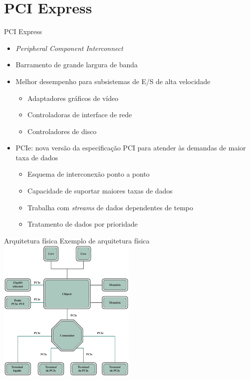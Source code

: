\section[slide=true]{PCI Express}
\begin{slide}{PCI Express}
	\begin{itemize}
		\item \textit{Peripheral Component Interconnect}
		\item Barramento de grande largura de banda
		\item Melhor desempenho para subsistemas de E/S de alta velocidade
			\begin{itemize}
				\item Adaptadores gráficos de vídeo
				\item Controladoras de interface de rede
				\item Controladores de disco
			\end{itemize}
		\item PCIe: nova versão da especificação PCI para atender às demandas de maior taxa de dados
			\begin{itemize}
				\item Esquema de interconexão ponto a ponto
				\item Capacidade de suportar maiores taxas de dados
				\item Trabalha com \textit{streams} de dados dependentes de tempo
				\item Tratamento de dados por prioridade
			\end{itemize}
	\end{itemize}
\end{slide}

\begin{slide}{Arquitetura física}
Exemplo de arquitetura física\\
   \centering
   \includegraphics[width=0.5\textwidth]{figs/3-21}
\end{slide}

